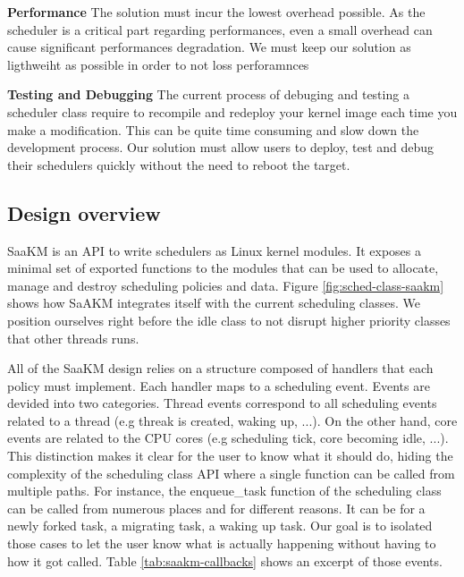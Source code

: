 \textbf{Performance} The solution must incur the lowest overhead possible. As the scheduler is a critical part regarding performances, even a small overhead can cause significant performances degradation. We must keep our solution as ligthweiht as possible in order to not loss perforamnces\newline

\textbf{Testing and Debugging} The current process of debuging and testing a scheduler class require to recompile and redeploy your kernel image each time you make a modification. This can be quite time consuming and slow down the development process. Our solution must allow users to deploy, test and debug their schedulers quickly without the need to reboot the target.\newline
\subsection{Design overview}
\par SaaKM is an API to write schedulers as Linux kernel modules. It exposes a minimal set of exported functions to the modules that can be used to allocate, manage and destroy scheduling policies and data. Figure \ref{fig:sched-class-saakm} shows how SaAKM integrates itself with the current scheduling classes. We position ourselves right before the idle class to not disrupt higher priority classes that other threads runs.\newline

\par All of the SaaKM design relies on a structure composed of handlers that each policy must implement. Each handler maps to a scheduling event. Events are devided into two categories. Thread events correspond to all scheduling events related to a thread (e.g threak is created, waking up, ...). On the other hand, core events are related to the CPU cores (e.g scheduling tick, core becoming idle, ...). This distinction makes it clear for the user to know what it should do, hiding the complexity of the scheduling class API where a single function can be called from multiple paths. For instance, the enqueue\_task function of the scheduling class can be called from numerous places and for different reasons. It can be for a newly forked task, a migrating task, a waking up task. Our goal is to isolated those cases to let the user know what is actually happening without having to how it got called. Table \ref{tab:saakm-callbacks} shows an excerpt of those events.\newline

